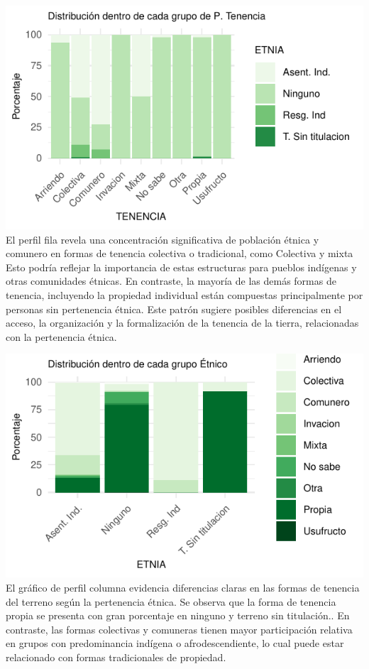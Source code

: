 \documentclass[]{tufte-handout}
\begin{document}
\includegraphics{Informe_files/figure-latex/perf-1} El perfil fila
revela una concentración significativa de población étnica y comunero en
formas de tenencia colectiva o tradicional, como Colectiva y mixta Esto
podría reflejar la importancia de estas estructuras para pueblos
indígenas y otras comunidades étnicas. En contraste, la mayoría de las
demás formas de tenencia, incluyendo la propiedad individual están
compuestas principalmente por personas sin pertenencia étnica. Este
patrón sugiere posibles diferencias en el acceso, la organización y la
formalización de la tenencia de la tierra, relacionadas con la
pertenencia étnica.

\includegraphics{Informe_files/figure-latex/perc-1} El gráfico de perfil
columna evidencia diferencias claras en las formas de tenencia del
terreno según la pertenencia étnica. Se observa que la forma de tenencia
propia se presenta con gran porcentaje en ninguno y terreno sin
titulación.. En contraste, las formas colectivas y comuneras tienen
mayor participación relativa en grupos con predominancia indígena o
afrodescendiente, lo cual puede estar relacionado con formas
tradicionales de propiedad.
\end{document}
